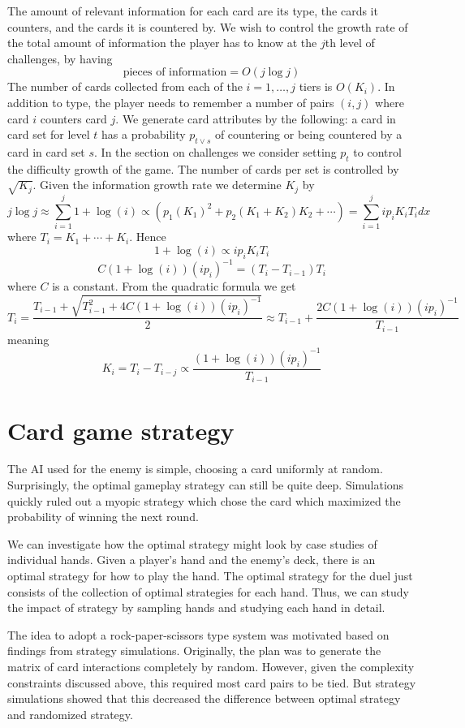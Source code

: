 \documentclass[11pt]{article}
\begin{document}
The amount of relevant information for each card are its type, the cards it counters, and the cards it is countered by.
We wish to control the growth rate of the total amount of information the player has to know
at the $j$th level of challenges, by having
\[
\text{pieces of information} = O(j\log j)
\]
The number of cards collected from each of the $i=1,\hdots,j$ tiers is $O(K_i)$.
In addition to type, the player needs to remember a number of pairs $(i,j)$ where card $i$ counters card $j$.
We generate card attributes by the following: a card in card set for level $t$ has a probability $p_{t \vee s}$ of countering or being countered by a card in card set $s$.
In the section on challenges we consider setting $p_t$ to control the difficulty growth of the game.
The number of cards per set is controlled by $\sqrt{K_j}$.
Given the information growth rate we determine $K_j$ by
\[
j\log j \approx \sum_{i=1}^j 1+\log(i) \propto (p_1 (K_1)^2 + p_2 (K_1+K_2)K_2 + \cdots ) = \sum_{i=1}^j i p_i K_i T_i dx 
\]
where $T_i = K_1 + \cdots + K_i$. Hence
\[
1+\log(i) \propto i p_i K_i T_i
\]
\[
C(1+\log(i)) (i p_i)^{-1} = (T_i-T_{i-1}) T_i
\]
where $C$ is a constant.
From the quadratic formula we get
\[
T_i = \frac{T_{i-1} + \sqrt{T_{i-1}^2 + 4C(1+\log(i))(i p_i)^{-1}}}{2} \approx T_{i-1} + \frac{2C(1+\log(i))(i p_i)^{-1}}{T_{i-1}}
\]
meaning
\[
K_i = T_i-T_{i-j} \propto \frac{(1+\log(i))(i p_i)^{-1}}{T_{i-1}}
\]


\section{Card game strategy}

The AI used for the enemy is simple, choosing a card uniformly at random.
Surprisingly, the optimal gameplay strategy can still be quite deep.
Simulations quickly ruled out a myopic strategy which chose the card which maximized
the probability of winning the next round.

We can investigate how the optimal strategy might look by case studies of individual hands.
Given a player's hand and the enemy's deck, there is an optimal strategy for how to play the hand.
The optimal strategy for the duel just consists of the collection of optimal strategies for each hand.
Thus, we can study the impact of strategy by sampling hands and studying each hand in detail.

The idea to adopt a rock-paper-scissors type system was motivated based on findings from strategy simulations. 
Originally, the plan was to generate the matrix of card interactions completely by random.
However, given the complexity constraints discussed above, this required most card pairs to be tied.
But strategy simulations showed that this decreased the difference between optimal strategy and randomized strategy.
\end{document}
